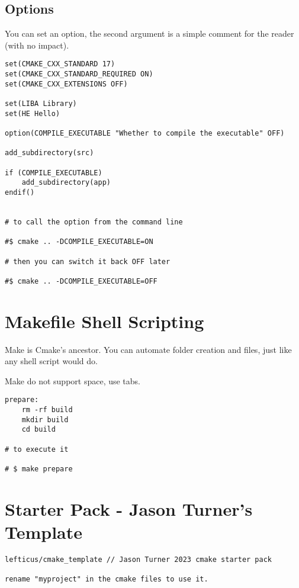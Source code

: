 \subsection{Options}

You can set an option, the second argument is a simple comment for the reader (with no impact).

\begin{verbatim}
set(CMAKE_CXX_STANDARD 17)
set(CMAKE_CXX_STANDARD_REQUIRED ON)
set(CMAKE_CXX_EXTENSIONS OFF)

set(LIBA Library)
set(HE Hello)

option(COMPILE_EXECUTABLE "Whether to compile the executable" OFF)

add_subdirectory(src)

if (COMPILE_EXECUTABLE)
    add_subdirectory(app)
endif()


# to call the option from the command line

#$ cmake .. -DCOMPILE_EXECUTABLE=ON

# then you can switch it back OFF later

#$ cmake .. -DCOMPILE_EXECUTABLE=OFF
\end{verbatim}


\section{Makefile Shell Scripting}

Make is Cmake's ancestor. You can automate folder creation and files, just like any shell script would do. 

Make do not support space, use tabs.

\begin{verbatim}
prepare:
    rm -rf build
    mkdir build
    cd build

# to execute it

# $ make prepare
\end{verbatim}


\section{Starter Pack - Jason Turner's Template}

\begin{verbatim}
lefticus/cmake_template // Jason Turner 2023 cmake starter pack

rename "myproject" in the cmake files to use it.
\end{verbatim}

